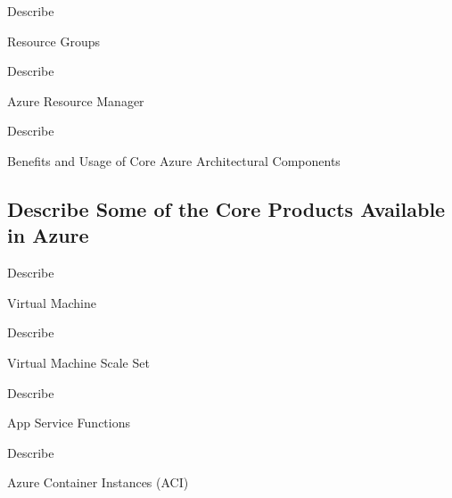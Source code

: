 \documentclass{scrartcl}
\newenvironment{flashcard}[2][]{%
    #1
    \vfill
    \centerline{\Large{#2}}
    \vfill
    \newpage
}
{\newpage}
\newcommand{\subsectioncard}[1]{
    \vspace*{\stretch{1}}
    \subsection{#1}
    \vspace*{\stretch{1}}
    \pagebreak
}
\begin{document}
    \begin{flashcard}[Describe]{Resource Groups}

    \end{flashcard}

    \begin{flashcard}[Describe]{Azure Resource Manager}

    \end{flashcard}

    \begin{flashcard}[Describe]{Benefits and Usage of Core Azure Architectural Components}

    \end{flashcard}

    \subsectioncard{Describe Some of the Core Products Available in Azure}


    \begin{flashcard}[Describe]{Virtual Machine}

    \end{flashcard}

    \begin{flashcard}[Describe]{Virtual Machine Scale Set}

    \end{flashcard}

    \begin{flashcard}[Describe]{App Service Functions}

    \end{flashcard}

    \begin{flashcard}[Describe]{Azure Container Instances (ACI)}

    \end{flashcard}
\end{document}
